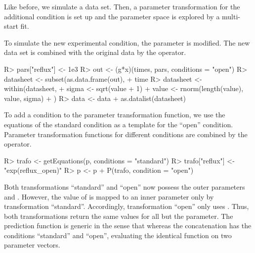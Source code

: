 \documentclass[article]{jss}
\begin{document}
Like before, we simulate a data set. Then, a parameter transformation for the additional condition is set up and the parameter space is explored by a multi-start fit.

To simulate the new experimental condition, the  parameter is modified. The new data set is combined with the original data by the  operator.
%
\begin{CodeChunk}
\begin{CodeInput}
R> pars["reflux"] <- 1e3
R> out <- (g*x)(times, pars, conditions = "open")
R> datasheet <- subset(as.data.frame(out),
+    time %
R> datasheet <- within(datasheet, {
+    sigma <- sqrt(value + 1)
+    value <- rnorm(length(value), value, sigma)
+  })
R> data <- data + as.datalist(datasheet)
\end{CodeInput}
\end{CodeChunk}
%
To add a condition to the parameter transformation function, we use the equations of the standard condition as a template for the ``open'' condition. Parameter transformation functions for different conditions are combined by the  operator.
%
\begin{CodeChunk}
\begin{CodeInput}
R> trafo <- getEquations(p, conditions = "standard")
R> trafo["reflux"] <- "exp(reflux_open)"
R> p <- p + P(trafo, condition = "open")
\end{CodeInput}
\end{CodeChunk}
%
Both transformations ``standard'' and ``open'' now possess the outer parameters  and . However, the value of  is mapped to an inner parameter only by transformation ``standard''. Accordingly, transformation ``open'' only uses . 
Thus, both transformations return the same values for all but the  parameter. The prediction function  is generic in the sense that  whereas the concatenation  has the conditions ``standard'' and ``open'', evaluating the identical function  on two parameter vectors.
\end{document}
